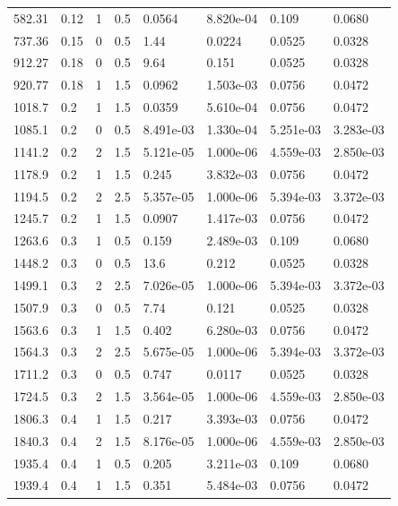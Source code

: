 \documentclass[preview]{standalone}
\begin{document}
{{\begin{tabular}{L{1.2cm}C{1.2cm} C{0.3cm}C{0.5cm} C{1.4cm}C{1.4cm} C{1.4cm}C{1.4cm}}
  582.31  &  0.12  & 1     & 0.5 &  0.0564  & 8.820e-04  & 0.109 &  0.0680   \\ 
  737.36  &  0.15  & 0     & 0.5 &  1.44  & 0.0224  & 0.0525 &  0.0328   \\ 
  912.27  &  0.18  & 0     & 0.5 &  9.64  & 0.151  & 0.0525 &  0.0328   \\ 
  920.77  &  0.18  & 1     & 1.5 &  0.0962  & 1.503e-03  & 0.0756 &  0.0472   \\ 
  1018.7  &   0.2  & 1     & 1.5 &  0.0359  & 5.610e-04  & 0.0756 &  0.0472   \\ 
  1085.1  &   0.2  & 0     & 0.5 &  8.491e-03  & 1.330e-04  & 5.251e-03 &  3.283e-03   \\ 
  1141.2  &   0.2  & 2     & 1.5 &  5.121e-05  & 1.000e-06  & 4.559e-03 &  2.850e-03   \\ 
  1178.9  &   0.2  & 1     & 1.5 &  0.245  & 3.832e-03  & 0.0756 &  0.0472   \\ 
  1194.5  &   0.2  & 2     & 2.5 &  5.357e-05  & 1.000e-06  & 5.394e-03 &  3.372e-03   \\ 
  1245.7  &   0.2  & 1     & 1.5 &  0.0907  & 1.417e-03  & 0.0756 &  0.0472   \\ 
  1263.6  &   0.3  & 1     & 0.5 &  0.159  & 2.489e-03  & 0.109 &  0.0680   \\ 
  1448.2  &   0.3  & 0     & 0.5 &  13.6  & 0.212  & 0.0525 &  0.0328   \\ 
  1499.1  &   0.3  & 2     & 2.5 &  7.026e-05  & 1.000e-06  & 5.394e-03 &  3.372e-03   \\ 
  1507.9  &   0.3  & 0     & 0.5 &  7.74  & 0.121  & 0.0525 &  0.0328   \\ 
  1563.6  &   0.3  & 1     & 1.5 &  0.402  & 6.280e-03  & 0.0756 &  0.0472   \\ 
  1564.3  &   0.3  & 2     & 2.5 &  5.675e-05  & 1.000e-06  & 5.394e-03 &  3.372e-03   \\ 
  1711.2  &   0.3  & 0     & 0.5 &  0.747  & 0.0117  & 0.0525 &  0.0328   \\ 
  1724.5  &   0.3  & 2     & 1.5 &  3.564e-05  & 1.000e-06  & 4.559e-03 &  2.850e-03   \\ 
  1806.3  &   0.4  & 1     & 1.5 &  0.217  & 3.393e-03  & 0.0756 &  0.0472   \\ 
  1840.3  &   0.4  & 2     & 1.5 &  8.176e-05  & 1.000e-06  & 4.559e-03 &  2.850e-03   \\ 
  1935.4  &   0.4  & 1     & 0.5 &  0.205  & 3.211e-03  & 0.109 &  0.0680   \\ 
  1939.4  &   0.4  & 1     & 1.5 &  0.351  & 5.484e-03  & 0.0756 &  0.0472   \\ 

\end{tabular}}}
\end{document}
